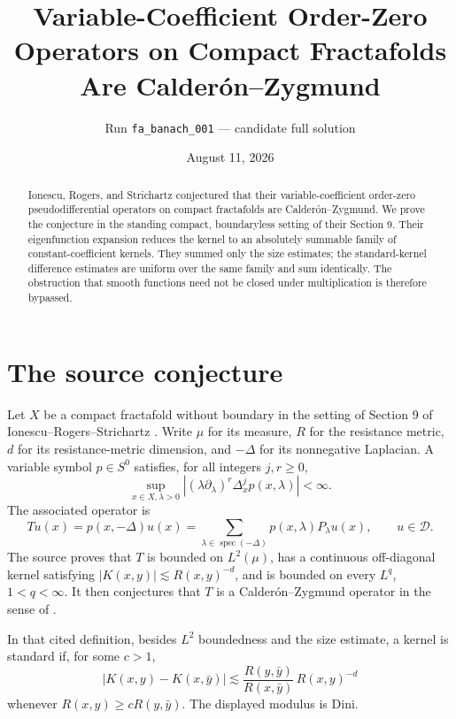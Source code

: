 \documentclass[11pt]{article}
\title{Variable-Coefficient Order-Zero Operators on Compact Fractafolds\\
Are Calder\'on--Zygmund}
\author{Run \texttt{fa\_banach\_001} --- candidate full solution}
\date{August 11, 2026}
\newcommand{\Rmet}{R}
\newcommand{\cD}{\mathcal D}
\begin{document}
\maketitle

\begin{abstract}
Ionescu, Rogers, and Strichartz conjectured that their
variable-coefficient order-zero pseudodifferential operators on compact
fractafolds are Calder\'on--Zygmund. We prove the conjecture in the standing
compact, boundaryless setting of their Section 9. Their eigenfunction
expansion reduces the kernel to an absolutely summable family of
constant-coefficient kernels. They summed only the size estimates; the
standard-kernel difference estimates are uniform over the same family and
sum identically. The obstruction that smooth functions need not be closed
under multiplication is therefore bypassed.
\end{abstract}

\section{The source conjecture}
Let $X$ be a compact fractafold without boundary in the setting of
Section 9 of Ionescu--Rogers--Strichartz \cite{IRS}. Write $\mu$ for its
measure, $\Rmet$ for the resistance metric, $d$ for its resistance-metric
dimension, and $-\Delta$ for its nonnegative Laplacian. A variable symbol
$p\in S^0$ satisfies, for all integers $j,r\ge0$,
\begin{equation}\label{eq:symbol}
 \sup_{x\in X,\lambda>0}
 \left| (\lambda\partial_\lambda)^r\Delta_x^j p(x,\lambda)\right|
 <\infty.
\end{equation}
The associated operator is
\[
 Tu(x)=p(x,-\Delta)u(x)
 =\sum_{\lambda\in\operatorname{spec}(-\Delta)}
 p(x,\lambda)P_\lambda u(x),\qquad u\in\cD.
\]
The source proves that $T$ is bounded on $L^2(\mu)$, has a continuous
off-diagonal kernel satisfying $|K(x,y)|\lesssim \Rmet(x,y)^{-d}$, and is
bounded on every $L^q$, $1<q<\infty$. It then conjectures that $T$ is a
Calder\'on--Zygmund operator in the sense of \cite{IR}.

In that cited definition, besides $L^2$ boundedness and the size estimate, a
kernel is standard if, for some $c>1$,
\begin{equation}\label{eq:standard}
 |K(x,y)-K(x,\bar y)|
 \lesssim
 \frac{\Rmet(y,\bar y)}{\Rmet(x,\bar y)}\,
 \Rmet(x,y)^{-d}
\end{equation}
whenever $\Rmet(x,y)\ge c\Rmet(y,\bar y)$. The displayed modulus is Dini.
\end{document}
